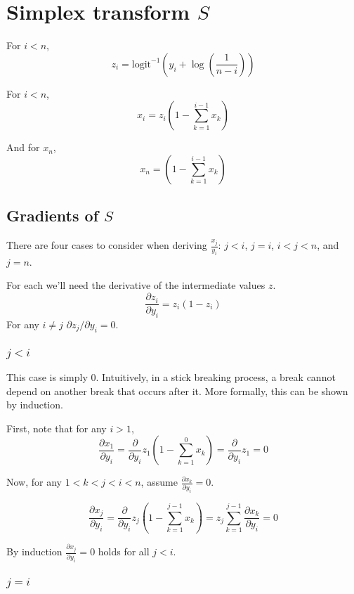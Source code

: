 \documentclass{article}
\begin{document}
\section{Simplex transform $S$}


For $i < n$,
$$z_i = \text{logit}^{-1}\left(y_i + \log\left(\frac{1}{n - i}\right)\right)$$

For $i < n$,
$$x_i = z_i \left(1 - \sum_{k=1}^{i-1} x_k \right)$$

And for $x_n$,
$$x_n = \left(1 - \sum_{k=1}^{i-1} x_k \right)$$


\subsection{Gradients of $S$}


There are four cases to consider when deriving $\frac{x_j}{y_i}$: $j < i$, $j =
i$, $i < j < n$, and  $j = n$.


For each we'll need the derivative of the intermediate values $z$.
\begin{equation}
\frac{\partial z_i}{\partial y_i} = z_i (1 - z_i)
\end{equation}
For any $i \neq j$ $\partial z_j / \partial y_i = 0$.


\subsubsection{$j < i$}
This case is simply 0. Intuitively, in a stick breaking process, a break cannot
depend on another break that occurs after it. More formally, this can be shown
by induction.

First, note that for any $i > 1$,
$$\frac{\partial x_1}{\partial y_i} = \frac{\partial}{\partial
y_i} z_1 \left(1 - \sum_{k=1}^0 x_k \right) = \frac{\partial}{\partial y_i} z_1 = 0$$

Now, for any $1 < k < j < i < n$, assume $\frac{\partial x_k}{\partial y_i} = 0$.

$$\frac{\partial x_j}{\partial y_i} = \frac{\partial}{\partial y_i} z_j \left(1 -
\sum_{k=1}^{j-1} x_k \right) = z_j \sum_{k=1}^{j-1} \frac{\partial x_k}{\partial y_i} = 0
$$

By induction $\frac{\partial x_j}{\partial y_i} = 0$ holds for all $j < i$.


\subsubsection{$j = i$}
\end{document}
